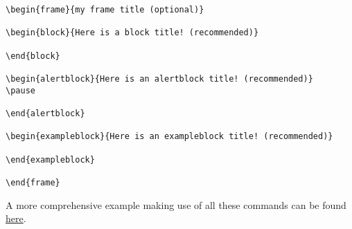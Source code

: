 \begin{lstlisting}[caption = Frame and block example]
\begin{frame}{my frame title (optional)}

\begin{block}{Here is a block title! (recommended)}

\end{block}

\begin{alertblock}{Here is an alertblock title! (recommended)}
\pause

\end{alertblock}

\begin{exampleblock}{Here is an exampleblock title! (recommended)}

\end{exampleblock}

\end{frame}
\end{lstlisting}
A more comprehensive example making use of all these commands can be found \href{https://drive.google.com/folderview?id=0Bzf79yzZcPJJUXh0ZmZOLU9PQ0E&usp=sharing}{here}.